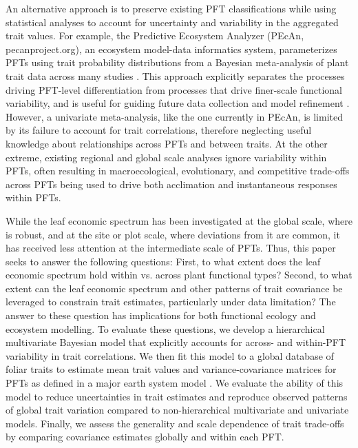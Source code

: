 An alternative approach is to preserve existing PFT classifications
\cite[though potentially with finer taxonomic, functional, or spatial resolution, e.g.]{boulangeat_improving_2012}
while using statistical analyses to account for uncertainty and variability in the aggregated trait values.
For example, the Predictive Ecosystem Analyzer (PEcAn, pecanproject.org), an ecosystem model-data informatics system, parameterizes PFTs using trait probability distributions from a Bayesian meta-analysis of plant trait data across many studies
\cite{dietze_improving_2013,lebauer_facilitating_2013}.
This approach explicitly separates the processes driving PFT-level differentiation from processes that drive finer-scale functional variability,
and is useful for guiding future data collection and model refinement \cite{dietze_quantitative_2014}.
However, a univariate meta-analysis, like the one currently in PEcAn, is limited by its failure to account for trait correlations, therefore neglecting useful knowledge about relationships across PFTs and between traits.
At the other extreme, existing regional and global scale analyses \cite[e.g.]{van_bodegom_going_2012,sakschewski_leaf_2015} ignore variability within PFTs, often resulting in macroecological, evolutionary, and competitive trade-offs across PFTs being used to drive both acclimation and instantaneous responses within PFTs.

While the leaf economic spectrum has been investigated at the global scale, where is robust, and at the site or plot scale, where deviations from it are common, it has received less attention at the intermediate scale of PFTs.
Thus, this paper seeks to answer the following questions:
First, to what extent does the leaf economic spectrum hold within vs. across plant functional types?
Second, to what extent can the leaf economic spectrum and other patterns of trait covariance be leveraged to constrain trait estimates, particularly under data limitation?
The answer to these question has implications for both functional ecology and ecosystem modelling.
To evaluate these questions, we develop a hierarchical multivariate Bayesian model that explicitly accounts for across- and within-PFT variability in trait correlations.
We then fit this model to a global database of foliar traits to estimate mean trait values and variance-covariance matrices for PFTs as defined in a major earth system model \cite[Community Land Model, CLM,]{clm45_note}.
We evaluate the ability of this model to reduce uncertainties in trait estimates and reproduce observed patterns of global trait variation compared to non-hierarchical multivariate and univariate models.
Finally, we assess the generality and scale dependence of trait trade-offs by comparing covariance estimates globally and within each PFT.
